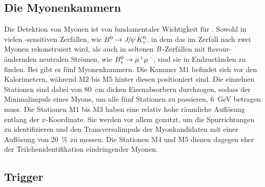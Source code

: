 \subsection{Die Myonenkammern}

Die Detektion von Myonen ist von fundamentaler Wichtigkeit für \lhcb. Sowohl in vielen \CP-sensitiven Zerfällen, wie ${{B}^0}\rightarrow{\ensuremath{{J\mskip -3mu/\mskip -2mu\psi\mskip 2mu}}}{\ensuremath{{K}^0_{\rm\scriptscriptstyle S}}}$, in dem das \jpsi im Zerfall nach zwei Myonen rekonstruiert wird, als auch in seltenen ${B}$-Zerfällen mit flavour-ändernden neutralen Strömen, wie ${{B}^0_{s}}\rightarrow{\ensuremath{\mu^+}}{\ensuremath{\mu^-}}$, sind sie in Endzuständen zu finden. Bei \lhcb gibt es fünf Myonenkammern. Die Kammer M$1$ befindet sich vor den Kalorimetern, während M$2$ bis M$5$ hinter diesen positioniert sind. Die einzelnen Stationen sind dabei von \SI{80}{cm} dicken Eisenabsorbern durchzogen, sodass der Minimalimpuls eines Myons, um alle fünf Stationen zu passieren, \SI{6}{GeV} betragen muss. Die Stationen M$1$ bis M$3$ haben eine relativ hohe räumliche Auflösung entlang der $x$-Koordinate. Sie werden vor allem genutzt, um die Spurrichtungen zu identifizieren und den Transversalimpuls \pt der Myonkandidaten mit einer Auflösung von \SI{20}{\%} zu messen. Die Stationen M$4$ und M$5$ dienen dagegen eher der Teilchenidentifikation eindringender Myonen.  

\subsection{Trigger}\label{sec:trigger}

